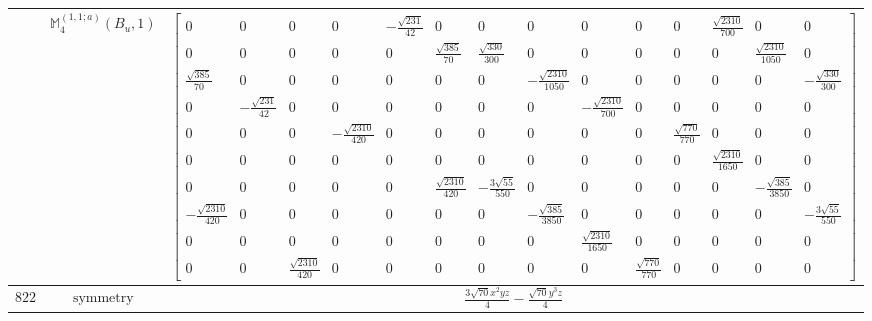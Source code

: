 \documentclass[fleqn,8pt,landscape]{jsarticle}
\begin{document}
\begin{longtable}{ccc}
$  $ & $ \mathbb{M}_{4}^{(1,1;a)}(B_{u},1) $ & $ \begin{bmatrix} 0 & 0 & 0 & 0 & - \frac{\sqrt{231}}{42} & 0 & 0 & 0 & 0 & 0 & 0 & \frac{\sqrt{2310}}{700} & 0 & 0 \\ 0 & 0 & 0 & 0 & 0 & \frac{\sqrt{385}}{70} & \frac{\sqrt{330}}{300} & 0 & 0 & 0 & 0 & 0 & \frac{\sqrt{2310}}{1050} & 0 \\ \frac{\sqrt{385}}{70} & 0 & 0 & 0 & 0 & 0 & 0 & - \frac{\sqrt{2310}}{1050} & 0 & 0 & 0 & 0 & 0 & - \frac{\sqrt{330}}{300} \\ 0 & - \frac{\sqrt{231}}{42} & 0 & 0 & 0 & 0 & 0 & 0 & - \frac{\sqrt{2310}}{700} & 0 & 0 & 0 & 0 & 0 \\ 0 & 0 & 0 & - \frac{\sqrt{2310}}{420} & 0 & 0 & 0 & 0 & 0 & 0 & \frac{\sqrt{770}}{770} & 0 & 0 & 0 \\ 0 & 0 & 0 & 0 & 0 & 0 & 0 & 0 & 0 & 0 & 0 & \frac{\sqrt{2310}}{1650} & 0 & 0 \\ 0 & 0 & 0 & 0 & 0 & \frac{\sqrt{2310}}{420} & - \frac{3 \sqrt{55}}{550} & 0 & 0 & 0 & 0 & 0 & - \frac{\sqrt{385}}{3850} & 0 \\ - \frac{\sqrt{2310}}{420} & 0 & 0 & 0 & 0 & 0 & 0 & - \frac{\sqrt{385}}{3850} & 0 & 0 & 0 & 0 & 0 & - \frac{3 \sqrt{55}}{550} \\ 0 & 0 & 0 & 0 & 0 & 0 & 0 & 0 & \frac{\sqrt{2310}}{1650} & 0 & 0 & 0 & 0 & 0 \\ 0 & 0 & \frac{\sqrt{2310}}{420} & 0 & 0 & 0 & 0 & 0 & 0 & \frac{\sqrt{770}}{770} & 0 & 0 & 0 & 0 \end{bmatrix} $ \\ \hline
$ 822 $ & $ \text{symmetry} $ & $ \frac{3 \sqrt{70} x^{2} y z}{4} - \frac{\sqrt{70} y^{3} z}{4} $ \\

\end{longtable}
\end{document}
